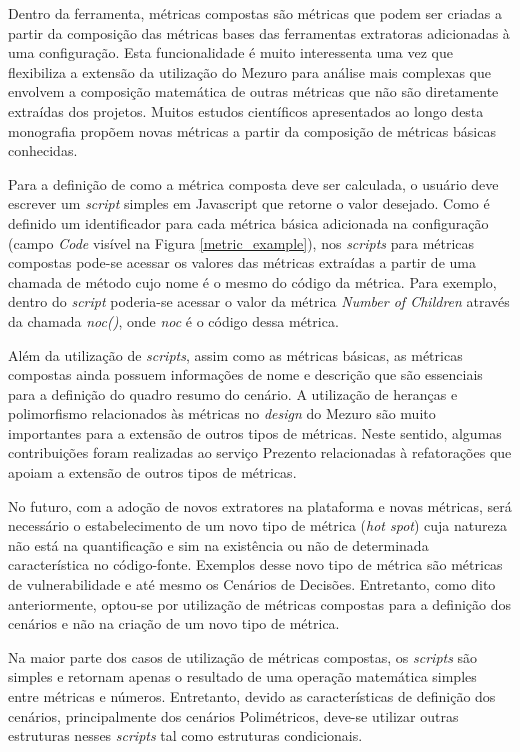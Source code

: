 Dentro da ferramenta, métricas compostas são métricas que podem ser criadas a partir da composição das métricas bases das ferramentas extratoras adicionadas à uma configuração. Esta funcionalidade é muito interessenta uma vez que flexibiliza a extensão da utilização do Mezuro para análise mais complexas que envolvem a composição matemática de outras métricas que não são diretamente extraídas dos projetos. Muitos estudos científicos apresentados ao longo desta monografia propõem novas métricas a partir da composição de métricas básicas conhecidas.

Para a definição de como a métrica composta deve ser calculada, o usuário deve escrever um \emph{script} simples em Javascript que retorne o valor desejado. Como é definido um identificador para cada métrica básica adicionada na configuração (campo \emph{Code} visível na Figura \ref{metric_example}), nos \emph{scripts} para métricas compostas pode-se acessar os valores das métricas extraídas a partir de uma chamada de método cujo nome é o mesmo do código da métrica. Para exemplo, dentro do \emph{script} poderia-se acessar o valor da métrica \emph{Number of Children} através da chamada \emph{noc()}, onde \emph{noc} é o código dessa métrica.

Além da utilização de \emph{scripts}, assim como as métricas básicas, as métricas compostas ainda possuem informações de nome e descrição que são essenciais para a definição do quadro resumo do cenário. A utilização de heranças e polimorfismo relacionados às métricas no \emph{design} do Mezuro são muito importantes para a extensão de outros tipos de métricas. Neste sentido, algumas contribuições foram realizadas ao serviço Prezento relacionadas à refatorações que apoiam a extensão de outros tipos de métricas. 

No futuro, com a adoção de novos extratores na plataforma e novas métricas, será necessário o estabelecimento de um novo tipo de métrica (\emph{hot spot}) cuja natureza não está na quantificação e sim na existência ou não de determinada característica no código-fonte. Exemplos desse novo tipo de métrica são métricas de vulnerabilidade e até mesmo os Cenários de Decisões. Entretanto, como dito anteriormente, optou-se por utilização de métricas compostas para a definição dos cenários e não na criação de um novo tipo de métrica.

Na maior parte dos casos de utilização de métricas compostas, os \emph{scripts} são simples e retornam apenas o resultado de uma operação matemática simples entre métricas e números. Entretanto, devido as características de definição dos cenários, principalmente dos cenários Polimétricos, deve-se utilizar outras estruturas nesses \emph{scripts} tal como estruturas condicionais.

